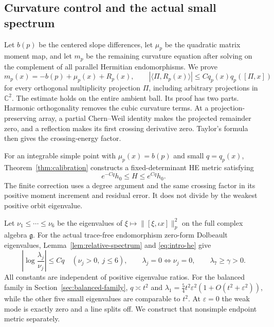 \documentclass[11pt]{amsart}
\theoremstyle{definition}
\theoremstyle{remark}
\newcommand{\CC}{\mathbb C}
\begin{document}
\subsection{Curvature control and the actual small spectrum}
Let $b(p)$ be the centered slope differences, let $\mu_p$ be the
quadratic matrix moment map, and let $m_p$ be the remaining curvature
equation after solving on the complement of all parallel Hermitian
endomorphisms. We prove
\[
 m_p(x)=-b(p)+\mu_p(x)+R_p(x),\qquad
 |\langle\Pi,R_p(x)\rangle|
       \le Cq_p(x)q_p([\Pi,x])
\]
for every orthogonal multiplicity projection $\Pi$, including arbitrary
projections in $\CC^2$. The estimate holds on the entire ambient
ball. Its proof has two parts. Harmonic orthogonality removes the
cubic curvature terms. At a projection-preserving array, a partial
Chern--Weil identity makes the projected remainder zero, and a
reflection makes its first crossing derivative zero. Taylor's formula
then gives the crossing-energy factor.

For an integrable simple point with $\mu_p(x)=b(p)$ and small
$q=q_p(x)$, Theorem~\ref{thm:calibration} constructs a fixed-determinant
HE metric satisfying
\begin{equation}\label{eq:intro-he}
 e^{-Cq}h_0\le H\le e^{Cq}h_0.
\end{equation}
The finite correction uses a degree argument and the same crossing
factor in its positive moment increment and residual error. It does
not divide by the weakest positive orbit eigenvalue.

Let $\nu_1\le\cdots\le\nu_6$ be the eigenvalues of
$\xi\mapsto\|[\xi,\iota x]\|_p^2$ on the full complex algebra
$\mathfrak g$. For the actual trace-free endomorphism zero-form Dolbeault
eigenvalues, Lemma~\ref{lem:relative-spectrum} and
\eqref{eq:intro-he} give
\begin{equation}\label{eq:intro-spectrum}
 \left|\log\frac{\lambda_j}{\nu_j}\right|\le Cq
 \quad(\nu_j>0,\ j\le6),\qquad
 \lambda_j=0\Longleftrightarrow\nu_j=0,\qquad \lambda_7\ge\gamma>0.
\end{equation}
All constants are independent of positive eigenvalue ratios.
For the balanced family in Section~\ref{sec:balanced-family},
$q\asymp t^2$ and
$\lambda_1=\tfrac54t^2\varepsilon^2(1+O(t^2+\varepsilon^2))$,
while the other five small eigenvalues are comparable to $t^2$.
At $\varepsilon=0$ the weak mode is exactly zero and a line splits
off. We construct that nonsimple endpoint metric separately.
\end{document}
